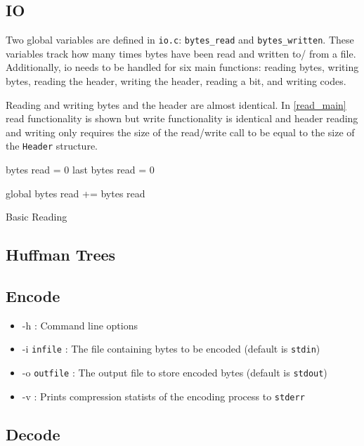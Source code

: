 \documentclass[12pt]{article}
\def\code#1{\texttt{#1}} %
\begin{document}
\subsection{IO}

Two global variables are defined in \code{io.c}: \code{bytes\_read} and \code{bytes\_written}.
These variables track how many times bytes have been read and written to/ from a file.
Additionally, io needs to be handled for six main functions: reading bytes, writing bytes,
reading the header, writing the header, reading a bit, and writing codes.

Reading and writing bytes and the header are almost identical. In \vref{read_main} read
functionality is shown but write functionality is identical and header reading and writing
only requires the size of the read/write call to be equal to the size of the \code{Header}
structure.

\begin{algorithm}
	bytes read = 0\;
	last bytes read = 0\;


	global bytes read += bytes read\;
	\caption{Basic Reading}\label{read_main}
\end{algorithm}



\subsection{Huffman Trees}

\subsection{Encode}

\begin{itemize}
	\item{-h : Command line options}
	\item{-i \code{infile} : The file containing bytes to be encoded (default is \code{stdin})}
	\item{-o \code{outfile} : The output file to store encoded bytes (default is \code{stdout})}
	\item{-v : Prints compression statists of the encoding process to \code{stderr}}
\end{itemize}

\subsection{Decode}
\end{document}
